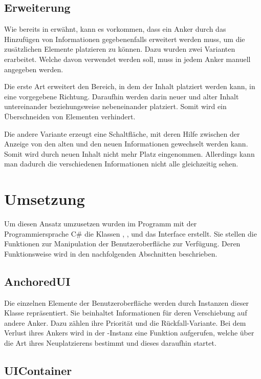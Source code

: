 		\subsection{Erweiterung}\label{chapter:expand}
			Wie bereits in  erwähnt, kann es vorkommen, dass ein Anker durch das Hinzufügen von Informationen gegebenenfalls erweitert werden muss, um die zusätzlichen Elemente platzieren zu können. Dazu wurden zwei Varianten erarbeitet. Welche davon verwendet werden soll, muss in jedem Anker manuell angegeben werden.
			
			Die erste Art erweitert den Bereich, in dem der Inhalt platziert werden kann, in eine vorgegebene Richtung. Daraufhin werden darin neuer und alter Inhalt untereinander beziehungsweise nebeneinander platziert. Somit wird ein Überschneiden von Elementen verhindert.
			

			Die andere Variante erzeugt eine Schaltfläche, mit deren Hilfe zwischen der Anzeige von den alten und den neuen Informationen gewechselt werden kann. Somit wird durch neuen Inhalt nicht mehr Platz eingenommen. Allerdings kann man dadurch die verschiedenen Informationen nicht alle gleichzeitig sehen.
			
	\section{Umsetzung}
		Um diesen Ansatz umzusetzen wurden im Programm  mit der Programmiersprache C\# die Klassen , ,  und das Interface  erstellt. Sie stellen die Funktionen zur Manipulation der Benutzeroberfläche zur Verfügung. Deren Funktionsweise wird in den nachfolgenden Abschnitten beschrieben.
		
		
		\subsection{AnchoredUI}
			Die einzelnen Elemente der Benutzeroberfläche werden durch Instanzen dieser Klasse repräsentiert. Sie beinhaltet Informationen für deren Verschiebung auf andere Anker. Dazu zählen ihre Priorität und die Rückfall-Variante. Bei dem Verlust ihres Ankers wird in der -Instanz eine Funktion aufgerufen, welche über die Art ihres Neuplatzierens bestimmt und dieses daraufhin startet.
		
		\subsection{UIContainer}
			
